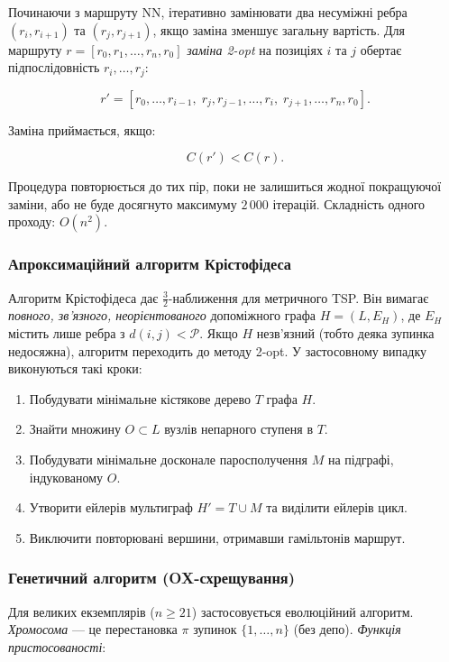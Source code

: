\documentclass[12pt, a4paper]{article}
\theoremstyle{definition}
\begin{document}
Починаючи з маршруту NN, ітеративно замінювати два несуміжні ребра
$(r_i, r_{i+1})$ та $(r_j, r_{j+1})$, якщо заміна зменшує загальну вартість.
Для маршруту $r = [r_0, r_1, \ldots, r_n, r_0]$ \emph{заміна 2-opt}
на позиціях $i$ та $j$ обертає підпослідовність $r_i, \ldots, r_j$:

\[
  r' = [r_0, \ldots, r_{i-1},\; r_j, r_{j-1}, \ldots, r_i,\; r_{j+1}, \ldots, r_n, r_0].
\]

Заміна приймається, якщо:

\begin{equation}
  \label{eq:2opt}
  C(r') < C(r).
\end{equation}

Процедура повторюється до тих пір, поки не залишиться жодної покращуючої
заміни, або не буде досягнуто максимуму $2\,000$ ітерацій. Складність одного
проходу: $O(n^2)$.

\subsubsection{Апроксимаційний алгоритм Крістофідеса}

Алгоритм Крістофідеса дає $\tfrac{3}{2}$-наближення для метричного TSP.
Він вимагає \emph{повного, зв'язного, неорієнтованого} допоміжного графа
$H = (L, E_H)$, де $E_H$ містить лише ребра з $d(i,j) < \mathcal{P}$.
Якщо $H$ незв'язний (тобто деяка зупинка недосяжна), алгоритм переходить до
методу 2-opt. У застосовному випадку виконуються такі кроки:

\begin{enumerate}[noitemsep]
  \item Побудувати мінімальне кістякове дерево $T$ графа $H$.
  \item Знайти множину $O \subset L$ вузлів непарного ступеня в $T$.
  \item Побудувати мінімальне досконале паросполучення $M$ на підграфі,
        індукованому $O$.
  \item Утворити ейлерів мультиграф $H' = T \cup M$ та виділити ейлерів цикл.
  \item Виключити повторювані вершини, отримавши гамільтонів маршрут.
\end{enumerate}

\subsubsection{Генетичний алгоритм (OX-схрещування)}

Для великих екземплярів ($n \geq 21$) застосовується еволюційний алгоритм.
\emph{Хромосома} --- це перестановка $\pi$ зупинок $\{1,\ldots,n\}$ (без
депо). \emph{Функція пристосованості}:
\end{document}
